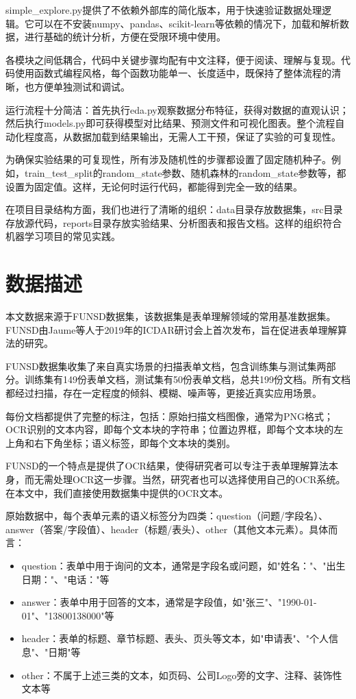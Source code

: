 \documentclass[12pt,a4paper]{article}
\begin{document}
simple_explore.py提供了不依赖外部库的简化版本，用于快速验证数据处理逻辑。它可以在不安装numpy、pandas、scikit-learn等依赖的情况下，加载和解析数据，进行基础的统计分析，方便在受限环境中使用。

各模块之间低耦合，代码中关键步骤均配有中文注释，便于阅读、理解与复现。代码使用函数式编程风格，每个函数功能单一、长度适中，既保持了整体流程的清晰，也方便单独测试和调试。

运行流程十分简洁：首先执行eda.py观察数据分布特征，获得对数据的直观认识；然后执行models.py即可获得模型对比结果、预测文件和可视化图表。整个流程自动化程度高，从数据加载到结果输出，无需人工干预，保证了实验的可复现性。

为确保实验结果的可复现性，所有涉及随机性的步骤都设置了固定随机种子。例如，train\_test\_split的random\_state参数、随机森林的random\_state参数等，都设置为固定值。这样，无论何时运行代码，都能得到完全一致的结果。

在项目目录结构方面，我们也进行了清晰的组织：data目录存放数据集，src目录存放源代码，reports目录存放实验结果、分析图表和报告文档。这样的组织符合机器学习项目的常见实践。

\section{数据描述}

本文数据来源于FUNSD数据集，该数据集是表单理解领域的常用基准数据集。FUNSD由Jaume等人于2019年的ICDAR研讨会上首次发布，旨在促进表单理解算法的研究。

FUNSD数据集收集了来自真实场景的扫描表单文档，包含训练集与测试集两部分。训练集有149份表单文档，测试集有50份表单文档，总共199份文档。所有文档都经过扫描，存在一定程度的倾斜、模糊、噪声等，更接近真实应用场景。

每份文档都提供了完整的标注，包括：原始扫描文档图像，通常为PNG格式；OCR识别的文本内容，即每个文本块的字符串；位置边界框，即每个文本块的左上角和右下角坐标；语义标签，即每个文本块的类别。

FUNSD的一个特点是提供了OCR结果，使得研究者可以专注于表单理解算法本身，而无需处理OCR这一步骤。当然，研究者也可以选择使用自己的OCR系统。在本文中，我们直接使用数据集中提供的OCR文本。

原始数据中，每个表单元素的语义标签分为四类：question（问题/字段名）、answer（答案/字段值）、header（标题/表头）、other（其他文本元素）。具体而言：

\begin{itemize}
    \item question：表单中用于询问的文本，通常是字段名或问题，如"姓名："、"出生日期："、"电话："等
    \item answer：表单中用于回答的文本，通常是字段值，如"张三"、"1990-01-01"、"13800138000"等
    \item header：表单的标题、章节标题、表头、页头等文本，如"申请表"、"个人信息"、"日期"等
    \item other：不属于上述三类的文本，如页码、公司Logo旁的文字、注释、装饰性文本等
\end{itemize}
\end{document}
